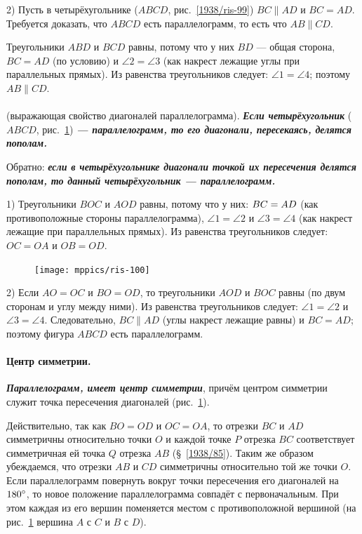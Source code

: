 \documentclass[twoside]{book}
\begin{document}
2) Пусть в четырёхугольнике ($ABCD$, рис.~\ref{1938/ris-99}) $BC\parallel AD$ и $BC = AD$.
Требуется доказать, что $ABCD$ есть параллелограмм, то есть что $AB \parallel CD$.

Треугольники $ABD$ и $BCD$ равны, потому что у них $BD$ — общая сторона, $BC = AD$ (по условию) и $\angle 2 = \angle 3$ (как накрест лежащие углы при параллельных прямых).
Из равенства треугольников следует:
$\angle 1 = \angle 4$;
поэтому $AB\parallel CD$.

\paragraph{}\label{1938/90}
 (выражающая свойство диагоналей параллелограмма).
\textbf{\emph{Если четырёхугольник}} ($ABCD$, рис.~\ref{1938/ris-100}) \textbf{\emph{— параллелограмм, то его диагонали, пересекаясь, делятся пополам.}}

Обратно:
\textbf{\emph{если в четырёхугольнике диагонали точкой их пересечения делятся пополам, то данный четырёхугольник — параллелограмм.}}

1) Треугольники $BOC$ и $AOD$ равны, потому что у них:
$BC\z=AD$ (как противоположные стороны параллелограмма), $\angle 1 = \angle 2$ и $\angle 3 = \angle 4$ (как накрест лежащие при параллельных прямых).
Из равенства треугольников следует:
$OC=OA$ и $OB=OD$.

{

\begin{figure}
\vskip-4mm
\centering
\texttt{[image: mppics/ris-100]}
\caption{}\label{1938/ris-100}
\end{figure}


2) Если $AO=OC$ и $BO=OD$, то треугольники $AOD$ и $BOC$ равны (по двум сторонам и углу между ними).
Из равенства треугольников следует:
$\angle 1 = \angle 2$ и $\angle 3 = \angle 4$.
Следовательно, $BC \parallel AD$ (углы накрест лежащие равны) и $BC=AD$;
поэтому фигура $ABCD$ есть параллелограмм.

}

\paragraph{Центр симметрии.}\label{1938/91}
\textbf{\emph{Параллелограмм, имеет центр симметрии}}, причём центром симметрии служит точка пересечения диагоналей (рис.~\ref{1938/ris-100}).

Действительно, так как $BO=OD$ и $OC=OA$, то отрезки $BC$ и $AD$ симметричны относительно точки $O$ и каждой точке $P$ отрезка $BC$ соответствует симметричная ей точка $Q$ отрезка $AB$ (§~\ref{1938/85}).
Таким же образом убеждаемся, что отрезки $AB$ и $CD$ симметричны относительно той же точки $O$.
Если параллелограмм повернуть вокруг точки пересечения его диагоналей на $180\degree$, то новое положение параллелограмма совпадёт с первоначальным.
При этом каждая из его вершин поменяется местом с противоположной вершиной 
(на рис.~\ref{1938/ris-100} вершина $A$ с $C$ и $B$ с $D$).
\end{document}
